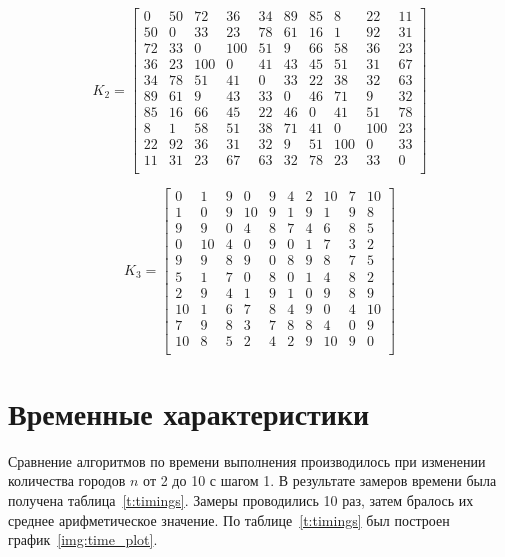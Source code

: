 \begin{equation}
	\label{eq:kd2}
K_{2} = \begin{bmatrix}
	0 & 50 & 72 & 36 & 34 & 89 & 85 & 8 & 22 & 11 \\
	50 & 0 & 33 & 23 & 78 & 61 & 16 & 1 & 92 & 31 \\
	72 & 33 & 0 & 100 & 51 & 9 & 66 & 58 & 36 & 23 \\
	36 & 23 & 100 & 0 & 41 & 43 & 45 & 51 & 31 & 67 \\
	34 & 78 & 51 & 41 & 0 & 33 & 22 & 38 & 32 & 63 \\
	89 & 61 & 9 & 43 & 33 & 0 & 46 & 71 & 9 & 32 \\
	85 & 16 & 66 & 45 & 22 & 46 & 0 & 41 & 51 & 78 \\
	8 & 1 & 58 & 51 & 38 & 71 & 41 & 0 & 100 & 23 \\
	22 & 92 & 36 & 31 & 32 & 9 & 51 & 100 & 0 & 33 \\
	11 & 31 & 23 & 67 & 63 & 32 & 78 & 23 & 33 & 0 \\
\end{bmatrix}
\end{equation}

\begin{equation}
	\label{eq:kd3}
K_{3} = \begin{bmatrix}
	0 & 1 & 9 & 0 & 9 & 4 & 2 & 10 & 7 & 10 \\
	1 & 0 & 9 & 10 & 9 & 1 & 9 & 1 & 9 & 8 \\
	9 & 9 & 0 & 4 & 8 & 7 & 4 & 6 & 8 & 5 \\
	0 & 10 & 4 & 0 & 9 & 0 & 1 & 7 & 3 & 2 \\
	9 & 9 & 8 & 9 & 0 & 8 & 9 & 8 & 7 & 5 \\
	5 & 1 & 7 & 0 & 8 & 0 & 1 & 4 & 8 & 2 \\
	2 & 9 & 4 & 1 & 9 & 1 & 0 & 9 & 8 & 9 \\
	10 & 1 & 6 & 7 & 8 & 4 & 9 & 0 & 4 & 10 \\
	7 & 9 & 8 & 3 & 7 & 8 & 8 & 4 & 0 & 9 \\
	10 & 8 & 5 & 2 & 4 & 2 & 9 & 10 & 9 & 0 \\
\end{bmatrix}
\end{equation}

\section{Временные характеристики}
Сравнение алгоритмов по времени выполнения производилось при изменении количества городов $n$ от 2 до 10 с шагом 1.
В результате замеров времени была получена таблица~\ref{t:timings}.
Замеры проводились 10 раз, затем бралось их среднее арифметическое значение. 
По таблице~\ref{t:timings} был построен график~\ref{img:time_plot}.

